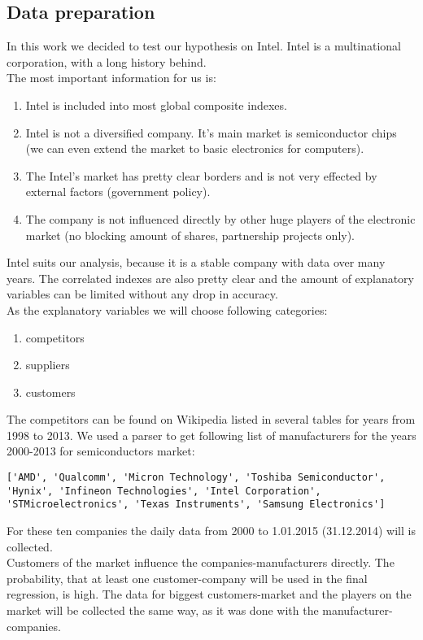 \documentclass {article}
\begin{document}
\subsection{Data preparation}
In this work we decided to test our hypothesis on Intel. Intel is a multinational corporation, with a long history behind.\\
The most important information for us is:
\begin{enumerate}
	\item Intel is included into most global composite indexes.
	\item Intel is not a diversified company. It's main market is semiconductor chips (we can even extend the market to basic electronics for computers). 
	\item The Intel's market has pretty clear borders and is not very effected by external factors (government policy). 
	\item The company is not influenced directly by other huge players of the electronic market (no blocking amount of shares, partnership projects only).
\end{enumerate}
Intel suits our analysis, because it is a stable company with data over many years. The correlated indexes are also pretty clear and the amount of explanatory variables can be limited without any drop in accuracy.\\
As the explanatory variables we will choose following categories:
\begin{enumerate}
	\item competitors
	\item suppliers
	\item customers
\end{enumerate} 
The competitors can be found on Wikipedia listed in several tables for years from 1998 to 2013. We used a parser to get following list of manufacturers for the years 2000-2013 for semiconductors market:
\begin{verbatim}
['AMD', 'Qualcomm', 'Micron Technology', 'Toshiba Semiconductor', 
'Hynix', 'Infineon Technologies', 'Intel Corporation',
'STMicroelectronics', 'Texas Instruments', 'Samsung Electronics']
\end{verbatim}
For these ten companies the daily data from 2000 to 1.01.2015 (31.12.2014) will is collected.\\
Customers of the market influence the companies-manufacturers directly. The probability, that at least one customer-company will be used in the final regression, is high. The data for biggest customers-market and the players on the market will be collected the same way, as it was done with the manufacturer-companies.
\end{document}
